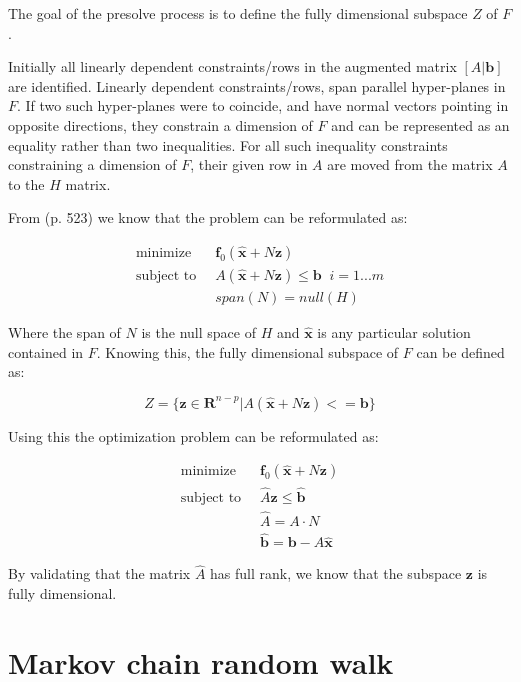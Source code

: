 \documentclass[11pt,a4paper,english]{article}
\begin{document}
The goal of the presolve process is to define the fully dimensional subspace $Z$ of $F$. 

Initially all linearly dependent constraints/rows in the augmented matrix $[ A|\mathbf{b}] $ are identified. Linearly dependent constraints/rows, span parallel hyper-planes in $F$. If two such hyper-planes were to coincide, and have normal vectors pointing in opposite directions, they constrain a dimension of $F$ and can be represented as an equality rather than two inequalities. For all such inequality constraints constraining a dimension of $F$, their given row in $A$ are moved from the matrix $A$ to the $H$ matrix.

From \cite{ConvexOpimization} (p. 523) we know that the problem can be reformulated as: 

\begin{align}
\text{minimize} \;&\; \mathbf{f}_0(\mathbf{\hat{x}} + N \mathbf{z})  \\
\text{subject to} \; &\; A(\mathbf{\hat{x}} + N \mathbf{z}) \leq \mathbf{b} \; \; i=1...m\\
\;            &\;  span(N) = null(H)
\end{align}

Where the span of $N$ is the null space of $H$ and $\mathbf{\hat{x}}$ is any particular solution contained in $F$.
Knowing this, the fully dimensional subspace of $F$ can be defined as:

\begin{equation}
Z = \{\mathbf{z} \in \mathbf{R}^{n-p} | A(\mathbf{\hat{x}} +  N \mathbf{z}) <= \mathbf{b}  \}
\end{equation}

Using this the optimization problem can be reformulated as:

\begin{align}
	\text{minimize} \;&\; \mathbf{f}_0(\mathbf{\hat{x}} + N \mathbf{z})  \\
	\text{subject to} \; &\; \hat{A}\mathbf{z} \leq \mathbf{\hat{b}} \label{eq:sub_problem}\\
	\;            &\;  \hat{A} = A \cdot N \\ 
	\;			& \; \mathbf{\hat{b}} = \mathbf{b}- A\mathbf{\hat{x}}
\end{align}

By validating that the matrix $\hat{A}$ has full rank, we know that the subspace $\mathbf{z}$ is fully dimensional. 

\section{Markov chain random walk}
\end{document}
